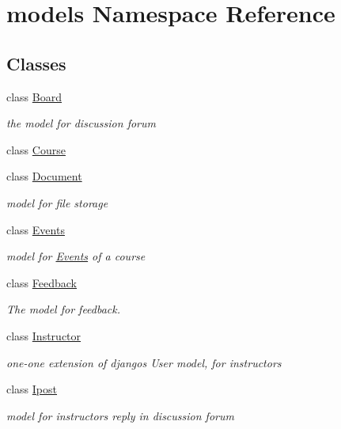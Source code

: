 \hypertarget{namespacemodels}{}\section{models Namespace Reference}
\label{namespacemodels}
\subsection*{Classes}
\begin{DoxyCompactItemize}
\item 
class \hyperlink{classmodels_1_1_board}{Board}
\begin{DoxyCompactList}\small\item\em the model for discussion forum \end{DoxyCompactList}\item 
class \hyperlink{classmodels_1_1_course}{Course}
\item 
class \hyperlink{classmodels_1_1_document}{Document}
\begin{DoxyCompactList}\small\item\em model for file storage \end{DoxyCompactList}\item 
class \hyperlink{classmodels_1_1_events}{Events}
\begin{DoxyCompactList}\small\item\em model for \hyperlink{classmodels_1_1_events}{Events} of a course \end{DoxyCompactList}\item 
class \hyperlink{classmodels_1_1_feedback}{Feedback}
\begin{DoxyCompactList}\small\item\em The model for feedback. \end{DoxyCompactList}\item 
class \hyperlink{classmodels_1_1_instructor}{Instructor}
\begin{DoxyCompactList}\small\item\em one-\/one extension of django\textquotesingle{}s User model, for instructors \end{DoxyCompactList}\item 
class \hyperlink{classmodels_1_1_ipost}{Ipost}
\begin{DoxyCompactList}\small\item\em model for instructor\textquotesingle{}s reply in discussion forum \end{DoxyCompactList}\item 

\end{DoxyCompactItemize}
